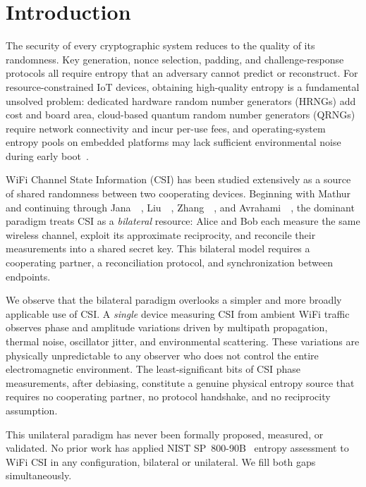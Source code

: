 \section{Introduction}
\label{sec:intro}

The security of every cryptographic system reduces to the quality of its randomness.
Key generation, nonce selection, padding, and challenge-response protocols all require entropy that an adversary cannot predict or reconstruct.
For resource-constrained IoT devices, obtaining high-quality entropy is a fundamental unsolved problem: dedicated hardware random number generators (HRNGs) add cost and board area, cloud-based quantum random number generators (QRNGs) require network connectivity and incur per-use fees, and operating-system entropy pools on embedded platforms may lack sufficient environmental noise during early boot~\cite{gutmann1998secure, wallace2016sensortrng}.

WiFi Channel State Information (CSI) has been studied extensively as a source of shared randomness between two cooperating devices.
Beginning with Mathur~\etal~\cite{mathur2008radio} and continuing through Jana~\etal~\cite{jana2009effectiveness}, Liu~\etal~\cite{liu2012exploiting}, Zhang~\etal~\cite{zhang2016csikey}, and Avrahami~\etal~\cite{avrahami2023csi}, the dominant paradigm treats CSI as a \emph{bilateral} resource: Alice and Bob each measure the same wireless channel, exploit its approximate reciprocity, and reconcile their measurements into a shared secret key.
This bilateral model requires a cooperating partner, a reconciliation protocol, and synchronization between endpoints.

We observe that the bilateral paradigm overlooks a simpler and more broadly applicable use of CSI.
A \emph{single} device measuring CSI from ambient WiFi traffic observes phase and amplitude variations driven by multipath propagation, thermal noise, oscillator jitter, and environmental scattering.
These variations are physically unpredictable to any observer who does not control the entire electromagnetic environment.
The least-significant bits of CSI phase measurements, after debiasing, constitute a genuine physical entropy source that requires no cooperating partner, no protocol handshake, and no reciprocity assumption.

This unilateral paradigm has never been formally proposed, measured, or validated.
No prior work has applied NIST SP~800-90B~\cite{nist2018sp80090b} entropy assessment to WiFi CSI in any configuration, bilateral or unilateral.
We fill both gaps simultaneously.

